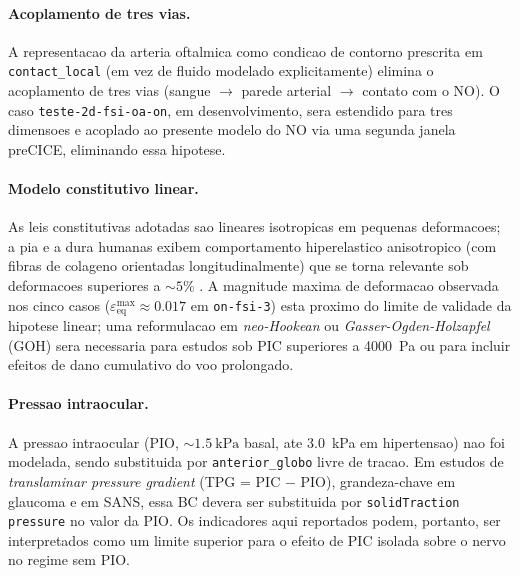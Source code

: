 \paragraph{Acoplamento de tres vias.} A representacao da arteria oftalmica como condicao de contorno prescrita em \texttt{contact\_local} (em vez de fluido modelado explicitamente) elimina o acoplamento de tres vias (sangue $\rightarrow$ parede arterial $\rightarrow$ contato com o NO). O caso \texttt{teste-2d-fsi-oa-on}, em desenvolvimento, sera estendido para tres dimensoes e acoplado ao presente modelo do NO via uma segunda janela preCICE, eliminando essa hipotese.

\paragraph{Modelo constitutivo linear.} As leis constitutivas adotadas sao lineares isotropicas em pequenas deformacoes; a pia e a dura humanas exibem comportamento hiperelastico anisotropico (com fibras de colageno orientadas longitudinalmente) que se torna relevante sob deformacoes superiores a $\sim 5\%$ \citep{Holzapfel2000}. A magnitude maxima de deformacao observada nos cinco casos ($\varepsilon_{\mathrm{eq}}^{\max} \approx 0.017$ em \texttt{on-fsi-3}) esta proximo do limite de validade da hipotese linear; uma reformulacao em \emph{neo-Hookean} ou \emph{Gasser-Ogden-Holzapfel} (GOH) sera necessaria para estudos sob PIC superiores a \SI{4000}{\pascal} ou para incluir efeitos de dano cumulativo do voo prolongado.

\paragraph{Pressao intraocular.} A pressao intraocular (PIO, $\sim \SI{1.5}{\kilo\pascal}$ basal, ate \SI{3.0}{\kilo\pascal} em hipertensao) nao foi modelada, sendo substituida por \texttt{anterior\_globo} livre de tracao. Em estudos de \emph{translaminar pressure gradient} (TPG = PIC $-$ PIO), grandeza-chave em glaucoma e em SANS, essa BC devera ser substituida por \texttt{solidTraction pressure} no valor da PIO. Os indicadores aqui reportados podem, portanto, ser interpretados como um limite superior para o efeito de PIC isolada sobre o nervo no regime sem PIO.

